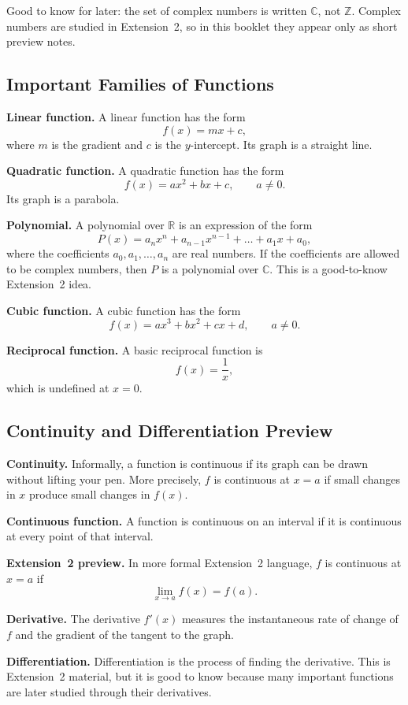 \documentclass[12pt]{article}
\theoremstyle{definition}
\begin{document}
Good to know for later: the set of complex numbers is written $\mathbb{C}$, not $\mathbb{Z}$. Complex numbers are studied in Extension~2, so in this booklet they appear only as short preview notes.

\subsection{Important Families of Functions}

\textbf{Linear function.} A linear function has the form
\[
f(x)=mx+c,
\]
where $m$ is the gradient and $c$ is the $y$-intercept. Its graph is a straight line.

\textbf{Quadratic function.} A quadratic function has the form
\[
f(x)=ax^2+bx+c, \qquad a \ne 0.
\]
Its graph is a parabola.

\textbf{Polynomial.} A polynomial over $\mathbb{R}$ is an expression of the form
\[
P(x)=a_nx^n+a_{n-1}x^{n-1}+\dots+a_1x+a_0,
\]
where the coefficients $a_0,a_1,\dots,a_n$ are real numbers. If the coefficients are allowed to be complex numbers, then $P$ is a polynomial over $\mathbb{C}$. This is a good-to-know Extension~2 idea.

\textbf{Cubic function.} A cubic function has the form
\[
f(x)=ax^3+bx^2+cx+d, \qquad a \ne 0.
\]

\textbf{Reciprocal function.} A basic reciprocal function is
\[
f(x)=\frac{1}{x},
\]
which is undefined at $x=0$.

\subsection{Continuity and Differentiation Preview}

\textbf{Continuity.} Informally, a function is continuous if its graph can be drawn without lifting your pen. More precisely, $f$ is continuous at $x=a$ if small changes in $x$ produce small changes in $f(x)$.

\textbf{Continuous function.} A function is continuous on an interval if it is continuous at every point of that interval.

\textbf{Extension~2 preview.} In more formal Extension~2 language, $f$ is continuous at $x=a$ if
\[
\lim_{x \to a} f(x) = f(a).
\]

\textbf{Derivative.} The derivative $f'(x)$ measures the instantaneous rate of change of $f$ and the gradient of the tangent to the graph.

\textbf{Differentiation.} Differentiation is the process of finding the derivative. This is Extension~2 material, but it is good to know because many important functions are later studied through their derivatives.
\end{document}

